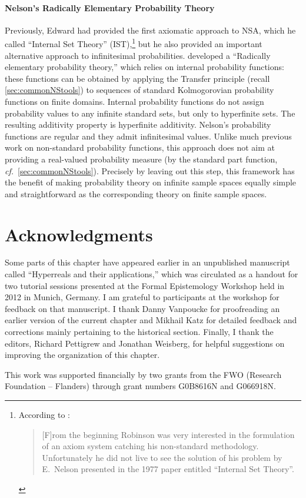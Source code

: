 \paragraph{Nelson's Radically Elementary Probability Theory}
Previously, Edward \citet{Nelson:1977} had provided the first axiomatic approach to NSA, which he called ``Internal Set Theory'' (IST),\footnote{According to \citet[p.~xi]{Luxemburg:2007}:
\begin{quote}
[F]rom the beginning Robinson was very interested in the formulation of an axiom system catching his non-standard methodology. Unfortunately he did not live to see the solution of his problem by E.~Nelson presented in the 1977 paper entitled ``Internal Set Theory''.
\end{quote}}
but he also provided an important alternative approach to infinitesimal probabilities. \citet{Nelson:1987} developed a ``Radically elementary probability theory,'' which relies on internal probability functions: these functions can be obtained by applying the Transfer principle (recall \autoref{sec:commonNStools}) to sequences of standard Kolmogorovian probability functions on finite domains. Internal probability functions do not assign probability values to any infinite standard sets, but only to hyperfinite sets. The resulting additivity property is hyperfinite additivity.
Nelson's probability functions are regular and they admit infinitesimal values. Unlike much previous work on non-standard probability functions, this approach does not aim at providing a real-valued probability measure (by the standard part function, \textit{cf.}\ \autoref{sec:commonNStools}). Precisely by leaving out this step, this framework has the benefit of making probability theory on infinite sample spaces equally simple and straightforward as the corresponding theory on finite sample spaces.

\section*{Acknowledgments}
Some parts of this chapter have appeared earlier in an un\-pub\-lished man\-u\-script called ``Hyperreals and their applications,'' which was circulated as a handout for two tutorial sessions presented at the Formal Epistemology Workshop held in 2012 in Munich, Germany. I am grateful to participants at the workshop for feedback on that manuscript.
I thank Danny Vanpoucke for proofreading an earlier version of the current chapter and Mikhail Katz for detailed feedback and corrections mainly pertaining to the historical section. Finally, I thank the editors, Richard Pettigrew and Jonathan Weisberg, for helpful suggestions on improving the organization of this chapter.

This work was supported financially by two grants from the FWO (Research Foundation -- Flanders) through grant numbers G0B8616N and G066918N.